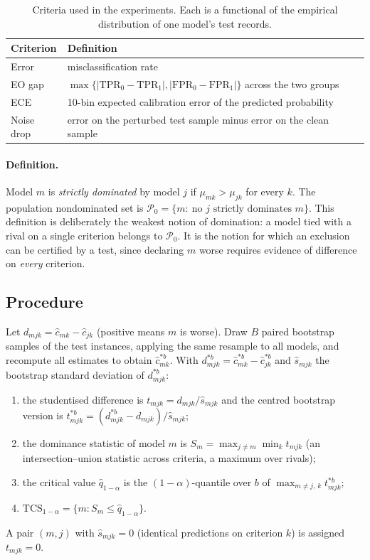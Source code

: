 \documentclass[pdflatex,sn-mathphys-num,iicol]{sn-jnl}
\theoremstyle{thmstyleone}
\theoremstyle{thmstyletwo}
\begin{document}
\begin{table}[t]\centering
\caption{Criteria used in the experiments. Each is a functional of the empirical distribution of one model's test records.}
\begin{tabular}{lp{5.4cm}}\toprule
Criterion & Definition\\\midrule
Error & misclassification rate\\
EO gap & $\max\{|\mathrm{TPR}_0-\mathrm{TPR}_1|,|\mathrm{FPR}_0-\mathrm{FPR}_1|\}$ across the two groups \cite{hardt2016}\\
ECE & 10-bin expected calibration error of the predicted probability \cite{guo2017}\\
Noise drop & error on the perturbed test sample minus error on the clean sample\\\bottomrule
\end{tabular}
\end{table}

\paragraph{Definition.} Model $m$ is \emph{strictly dominated} by model $j$ if $\mu_{mk}>\mu_{jk}$ for every $k$. The population nondominated set is $\mathcal{P}_0=\{m:\ \text{no } j \text{ strictly dominates } m\}$. This definition is deliberately the weakest notion of domination: a model tied with a rival on a single criterion belongs to $\mathcal{P}_0$. It is the notion for which an exclusion can be certified by a test, since declaring $m$ worse requires evidence of difference on \emph{every} criterion.

\subsection{Procedure}
Let $d_{mjk}=\hat c_{mk}-\hat c_{jk}$ (positive means $m$ is worse). Draw $B$ paired bootstrap samples of the test instances, applying the same resample to all models, and recompute all estimates to obtain $\hat c^{*b}_{mk}$. With $d^{*b}_{mjk}=\hat c^{*b}_{mk}-\hat c^{*b}_{jk}$ and $\hat s_{mjk}$ the bootstrap standard deviation of $d^{*b}_{mjk}$:
\begin{enumerate}
\item the studentised difference is $t_{mjk}=d_{mjk}/\hat s_{mjk}$ and the centred bootstrap version is $t^{*b}_{mjk}=(d^{*b}_{mjk}-d_{mjk})/\hat s_{mjk}$;
\item the dominance statistic of model $m$ is $S_m=\max_{j\ne m}\min_{k} t_{mjk}$ (an intersection--union statistic across criteria, a maximum over rivals);
\item the critical value $\hat q_{1-\alpha}$ is the $(1-\alpha)$-quantile over $b$ of $\max_{m\ne j,\,k} t^{*b}_{mjk}$;
\item $\mathrm{TCS}_{1-\alpha}=\{m: S_m\le \hat q_{1-\alpha}\}$.
\end{enumerate}
A pair $(m,j)$ with $\hat s_{mjk}=0$ (identical predictions on criterion $k$) is assigned $t_{mjk}=0$.
\end{document}
